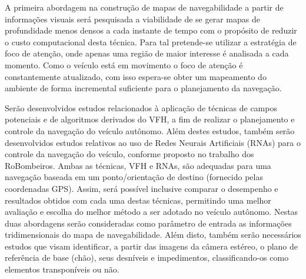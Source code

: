 A primeira abordagem na construção de mapas de navegabilidade a partir de
informações visuais será pesquisada a viabilidade de se gerar mapas de
profundidade menos densos a cada instante de tempo com o propósito de reduzir o
custo computacional desta técnica. Para tal pretende-se utilizar a estratégia de
foco de atenção, onde apenas uma região de maior interesse é analisada a cada
momento. Como o veículo está em movimento o foco de atenção é constantemente
atualizado, com isso espera-se obter um mapeamento do ambiente de forma
incremental suficiente para o planejamento da navegação.

Serão desenvolvidos estudos relacionados à aplicação de técnicas de campos
potenciais e de algoritmos derivados do VFH, a fim de realizar o planejamento e
controle da navegação do veículo autônomo. Além destes estudos, também serão
desenvolvidos estudos relativos ao uso de Redes Neurais Artificiais (RNAs) para
o controle da navegação do veículo, conforme proposto no trabalho dos
RoBombeiros. Ambas as técnicas, VFH e RNAs, são adequadas para uma navegação
baseada em um ponto/orientação de destino (fornecido pelas coordenadas GPS).
Assim, será possível inclusive comparar o desempenho e resultados obtidos com
cada uma destas técnicas, permitindo uma melhor avaliação e escolha do melhor
método a ser adotado no veículo autônomo.
Nestas duas abordagens serão consideradas como parâmetro de entrada as
informações tridimensionais do mapa de navegabilidade. Além disto, também serão
necessários estudos que visam identificar, a partir das imagens da câmera
estéreo, o plano de referência de base (chão), seus desníveis e impedimentos,
classificando-os como elementos transponíveis ou não. 



